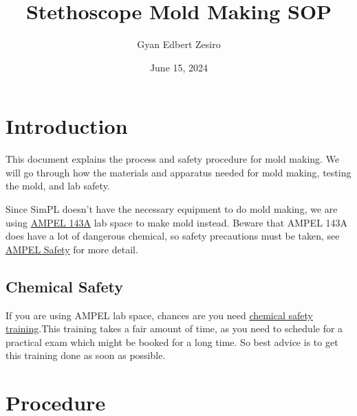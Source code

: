 \documentclass{article}
\title{Stethoscope Mold Making SOP}
\author{Gyan Edbert Zesiro}
\begin{document}
\date{June 15, 2024}
\maketitle
\tableofcontents
\newpage

\section{Introduction} 
This document explains the process and safety procedure for mold making. We will go through how the materials and apparatus needed for mold making, testing the mold, and lab safety.

Since SimPL doesn't have the necessary equipment to do mold making, we are using \href{https://www.ampel.ubc.ca/facilities/shared-soft-lithography-facility/}{AMPEL 143A} lab space to make mold instead. 
Beware that AMPEL 143A does have a lot of dangerous chemical, so safety precautions must be taken, see \href{https://www.ampel.ubc.ca/safety-2/}{AMPEL Safety} for more detail. 

\subsection{Chemical Safety}
If you are using AMPEL lab space, chances are you need \href{http://rms.ubc.ca/training-and-general-education-courses/research-safety-training-courses/chemical-safety-training/}{chemical safety training}.This training takes a fair amount of time, as you need to schedule for a practical exam which might be booked for a long time. So best advice is to get this training done as soon as possible.

\section{Procedure}
\end{document}
